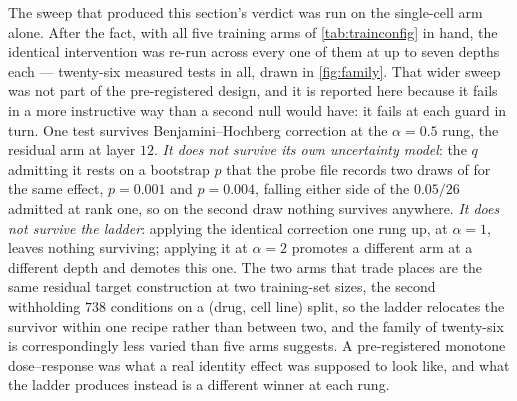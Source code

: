 The sweep that produced this section's verdict was run on the single-cell arm
alone. After the fact, with all five training arms of \cref{tab:trainconfig} in
hand, the identical intervention was re-run across every one of them at up to
seven depths each --- twenty-six measured tests in all, drawn in
\cref{fig:family}. That wider sweep was not part of the pre-registered design,
and it is reported here because it fails in a more instructive way than a second
null would have: it fails at each guard in turn. One test survives
Benjamini--Hochberg correction at the $\alpha = 0.5$ rung, the residual arm at
layer $12$. \emph{It does not survive its own uncertainty model}: the $q$
admitting it rests on a bootstrap $p$ that the probe file records two draws of
for the same effect, $p = 0.001$ and $p = 0.004$, falling either side of the
$0.05/26$ admitted at rank one, so on the second draw nothing survives anywhere.
\emph{It does not survive the ladder}: applying the identical correction one rung
up, at $\alpha = 1$, leaves nothing surviving; applying it at $\alpha = 2$
promotes a different arm at a different depth and demotes this one. The two arms
that trade places are the same residual target construction at two training-set
sizes, the second withholding $738$ conditions on a (drug, cell line) split, so
the ladder relocates the survivor within one recipe rather than between two, and
the family of twenty-six is correspondingly less varied than five arms suggests.
A pre-registered monotone dose--response was what a real identity effect was
supposed to look like, and what the ladder produces instead is a different winner
at each rung.

